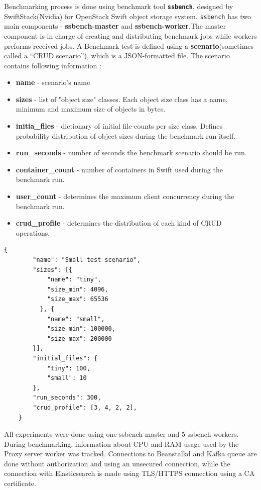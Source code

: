     Benchmarking process is done using benchmark tool \textbf{\texttt{ssbench}}, designed by SwiftStack(Nvidia) for OpenStack Swift object storage system. \texttt{ssbench} has two main components - \textbf{ssbench-master} and \textbf{ssbench-worker}.The master component is in charge of creating and distributing benchmark jobs while workers preforms received jobs. A Benchmark test is defined using a \textbf{scenario}(sometimes called a “CRUD scenario”), which is a JSON-formatted file. The scenario contains following information \cite{swiftSsbench123}:
    \begin{itemize}
        \item \textbf{name} - scenario's name
        \item \textbf{sizes} - list of "object size" classes. Each object size class has a name, minimum and maximum size of objects in bytes.
        \item \textbf{initia\_files} - dictionary of initial file-counts per size class. Defines probability distribution of object sizes during the benchmark run itself.
        \item \textbf{run\_seconds} - number of seconds the benchmark scenario should be run.
        \item \textbf{container\_count} - number of containers in Swift used during the benchmark run.
        \item \textbf{user\_count} - determines the maximum client concurrency during the benchmark run.
        \item \textbf{crud\_profile} - determines the distribution of each kind of CRUD operations.
    \end{itemize}

    \begin{lstlisting}[style=jsonStyle, caption=Example of ssbench scenario.]
    {
        "name": "Small test scenario",
        "sizes": [{
            "name": "tiny",
            "size_min": 4096,
            "size_max": 65536
          }, {
            "name": "small",
            "size_min": 100000,
            "size_max": 200000
        }],
        "initial_files": {
            "tiny": 100,
            "small": 10
        },
        "run_seconds": 300,
        "crud_profile": [3, 4, 2, 2],
    }
    \end{lstlisting}

    All experiments were done using one ssbench master and 5 ssbench workers. During benchmarking, information about CPU and RAM usage used by the Proxy server worker was tracked. Connections to Beanstalkd and Kafka queue are done without authorization and using an unsecured connection, while the connection with Elasticsearch is made using TLS/HTTPS connection using a CA certificate.

